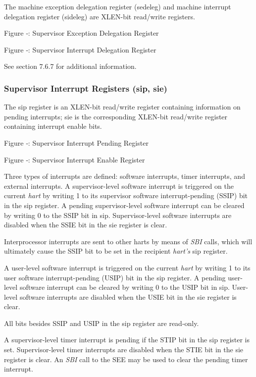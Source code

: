 The machine exception delegation register (sedeleg) and machine
interrupt delegation register (sideleg) are XLEN-bit read/write
registers.

\missingfigure{}

Figure ‑: Supervisor Exception Delegation Register

\missingfigure{}

Figure ‑: Supervisor Interrupt Delegation Register

See section 7.6.7 for additional information.

\subsubsection{Supervisor Interrupt Registers (sip, sie)}

The sip register is an XLEN-bit read/write register containing
information on pending interrupts; sie is the corresponding XLEN-bit
read/write register containing interrupt enable bits.

\missingfigure{}

Figure ‑: Supervisor Interrupt Pending Register

\missingfigure{}

Figure ‑: Supervisor Interrupt Enable Register

Three types of interrupts are defined: software interrupts, timer
interrupts, and external interrupts. A supervisor-level software
interrupt is triggered on the current \emph{hart} by writing 1 to its
supervisor software interrupt-pending (SSIP) bit in the sip register. A
pending supervisor-level software interrupt can be cleared by writing 0
to the SSIP bit in sip. Supervisor-level software interrupts are
disabled when the SSIE bit in the sie register is clear.

Interprocessor interrupts are sent to other harts by means of \emph{SBI}
calls, which will ultimately cause the SSIP bit to be set in the
recipient \emph{hart's} sip register.

A user-level software interrupt is triggered on the current \emph{hart}
by writing 1 to its user software interrupt-pending (USIP) bit in the
sip register. A pending user-level software interrupt can be cleared by
writing 0 to the USIP bit in sip. User-level software interrupts are
disabled when the USIE bit in the sie register is clear.

All bits besides SSIP and USIP in the sip register are read-only.

A supervisor-level timer interrupt is pending if the STIP bit in the sip
register is set. Supervisor-level timer interrupts are disabled when the
STIE bit in the sie register is clear. An \emph{SBI} call to the SEE may
be used to clear the pending timer interrupt.

